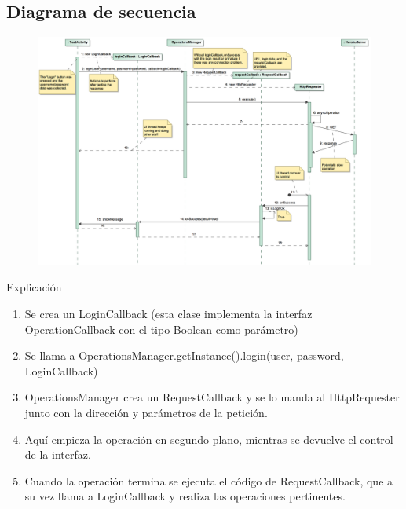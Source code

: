 \documentclass{beamer}
\begin{document}
\subsection{Diagrama de secuencia}
\begin{frame}
\begin{figure}
\begin{center}
\includegraphics[scale=0.32]{../observer-pattern/diagrams/login}
\end{center}
\end{figure}
\end{frame}

\begin{frame}{Explicación}
\begin{enumerate}
\item Se crea un LoginCallback (esta clase implementa la interfaz OperationCallback con el tipo Boolean como parámetro)
\item Se llama a OperationsManager.getInstance().login(user, password, LoginCallback)
\item OperationsManager crea un RequestCallback y se lo manda al HttpRequester junto con la dirección y parámetros de la petición.
\item Aquí empieza la operación en segundo plano, mientras se devuelve el control de la interfaz.
\item Cuando la operación termina se ejecuta el código de RequestCallback, que a su vez llama a LoginCallback y realiza las operaciones pertinentes.
\end{enumerate} 
\end{frame}
\end{document}
